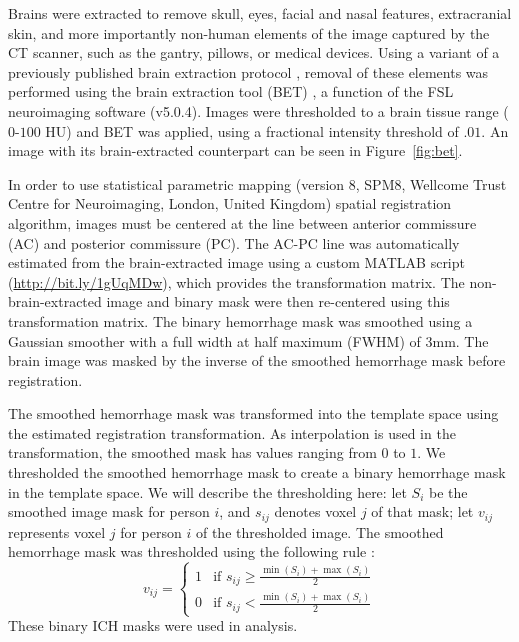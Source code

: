 \documentclass[10pt]{article}\usepackage[]{graphicx}\usepackage[]{color}
\begin{document}
Brains were extracted to remove skull, eyes, facial and nasal features, extracranial skin, and more importantly non-human elements of the image captured by the CT scanner, such as the gantry, pillows, or medical devices.  Using a variant of a previously published brain extraction protocol \citep{rorden_age-specific_2012}, removal of these elements was performed using the brain extraction tool (BET) \citep{smith_fast_2002}, a function of the FSL \citep{jenkinson_fsl_2012} neuroimaging software (v5.0.4).  Images were thresholded to a brain tissue range ($0$-$100$ HU) and BET was applied, using a fractional intensity threshold of $.01$.  An image with its brain-extracted counterpart can be seen in Figure~\ref{fig:bet}.  

In order to use statistical parametric mapping (version 8, SPM8, Wellcome Trust Centre for Neuroimaging, London, United Kingdom) spatial registration algorithm, images must be centered at the line between anterior commissure (AC) and posterior commissure (PC).  The AC-PC line was automatically estimated from the brain-extracted image using a custom MATLAB script (\url{http://bit.ly/1gUqMDw}), which provides the transformation matrix. 
The non-brain-extracted image and binary mask were then re-centered using this transformation matrix.  The binary hemorrhage mask was smoothed using a Gaussian smoother with a full width at half maximum (FWHM) of $3$mm.  The brain image was masked by the inverse of the smoothed hemorrhage mask before registration. 

The smoothed hemorrhage mask was transformed into the template space using the estimated registration transformation.  As interpolation is used in the transformation, the smoothed mask has values ranging from $0$ to $1$.  We thresholded the smoothed hemorrhage mask to create a binary hemorrhage mask in the template space.  
We will describe the thresholding here: let $S_i$ be the smoothed image mask for person $i$, and $s_{ij}$ denotes voxel $j$ of that mask; let $v_{ij}$ represents voxel $j$ for person $i$ of the thresholded image.  The smoothed hemorrhage mask was thresholded using the following rule \citep{rorden_age-specific_2012}:
$$
v_{ij} =
\begin{cases}
1  & \text{if } s_{ij} \geq \frac{\min(S_i) + \max(S_i)}{2}\\
0  & \text{if } s_{ij} < \frac{\min(S_i) + \max(S_i)}{2}
\end{cases}
$$
These binary ICH masks were used in analysis.  
\end{document}
